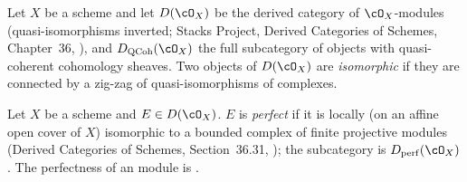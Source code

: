 \begin{definition}
\label{def:pc-derived-category}
Let $X$ be a scheme and let $D(\cO_X)$ be the derived category of
$\cO_X$-modules (quasi-isomorphisms inverted; Stacks Project, Derived
Categories of Schemes, Chapter~36,
), and
$D_{\text{QCoh}}(\cO_X)$ the full subcategory of objects with
quasi-coherent cohomology sheaves.  Two objects of $D(\cO_X)$ are
\emph{isomorphic} if they are connected by a zig-zag of
quasi-isomorphisms of complexes.
\mathlibok\ 
\end{definition}

\begin{definition}\label{def:pc-perfect-complex}
Let $X$ be a scheme and $E\in D(\cO_X)$.  $E$ is \emph{perfect} if it is
locally (on an affine open cover of $X$) isomorphic to a bounded complex
of finite projective modules (Derived Categories of Schemes,
Section~36.31,
); the subcategory
is $D_{\mathrm{perf}}(\cO_X)$.  The perfectness of an
 module is
.
\end{definition}

